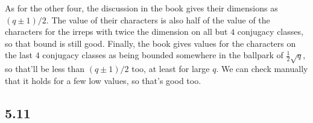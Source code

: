 \documentclass{article}
\begin{document}
As for the other four, the discussion in the book gives their dimensions as $(q\pm1)/2$. The value of their characters is also half of the value of the characters for the irreps with twice the dimension on all but $4$ conjugacy classes, so that bound is still good. Finally, the book gives values for the characters on the last $4$ conjugacy classes as being bounded somewhere in the ballpark of $\frac{1}{2}\sqrt{q}$, so that'll be less than $(q\pm1)/2$ too, at least for large $q$. We can check manually that it holds for a few low values, so that's good too.
\subsection*{5.11}
\end{document}
